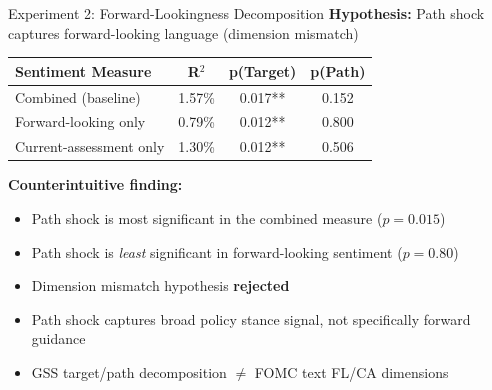 \documentclass[aspectratio=169, 11pt]{beamer}
\begin{document}
\begin{frame}{Experiment 2: Forward-Lookingness Decomposition}
  \textbf{Hypothesis:} Path shock captures forward-looking language (dimension mismatch)

  \vspace{0.3em}
  \centering
  \begin{tabular}{lccc}
    \toprule
    Sentiment Measure & R$^2$ & p(Target) & p(Path) \\
    \midrule
    Combined (baseline)     & 1.57\% & 0.017** & 0.152 \\
    Forward-looking only    & 0.79\% & 0.012** & 0.800 \\
    Current-assessment only & 1.30\% & 0.012** & 0.506 \\
    \bottomrule
  \end{tabular}

  \vspace{0.5em}
  \textbf{Counterintuitive finding:}
  \begin{itemize}
    \item Path shock is most significant in the combined measure ($p = 0.015$)
    \item Path shock is \emph{least} significant in forward-looking sentiment ($p = 0.80$)
    \item Dimension mismatch hypothesis \textbf{rejected}
    \item Path shock captures broad policy stance signal, not specifically forward guidance
    \item GSS target/path decomposition $\neq$ FOMC text FL/CA dimensions
  \end{itemize}
\end{frame}
\end{document}
